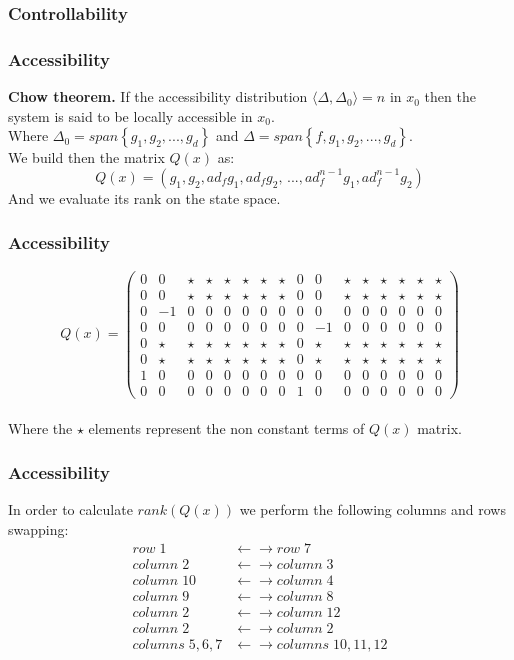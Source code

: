 \subsubsection{Controllability}
\begin{frame}
\frametitle{Accessibility}
\textbf{Chow theorem.} If the accessibility distribution $\langle\Delta, \Delta_0\rangle = n$ in $x_0$ then the system is said to be locally accessible in $x_0$.\\
\vspace{.8cm}
Where $\Delta_0 = span\left\{g_1, g_2,..., g_d\right\}$ and $\Delta = span\left\{f, g_1, g_2,..., g_d\right\}$.\\
\vspace{.8cm}
We build then the matrix $Q(x)$ as:
\begin{equation}
	Q(x) = (g_1, g_2, ad_fg_1, ad_fg_2,\,...,ad^{n-1}_fg_1,ad^{n-1}_fg_2)
\end{equation}
And we evaluate its rank on the state space.
\end{frame}
\begin{frame}
\frametitle{Accessibility}
\begin{equation*}
	Q(x) =%
	\begin{pmatrix}
		0 &0  &\star &\star &\star &\star &\star &\star &0 &0 &\star &\star &\star &\star &\star &\star \\
		0 &0  &\star &\star &\star &\star &\star &\star &0 &0 &\star &\star &\star &\star &\star &\star \\
		0 &-1 &0 &0 &0 &0 &0 &0 &0 &0 &0 &0 &0 &0 &0 &0 \\
		0 &0  &0 &0 &0 &0 &0 &0 &0 &-1 &0 &0 &0 &0 &0 &0 \\
		0 &\star &\star &\star &\star &\star &\star &\star &0 &\star &\star &\star &\star &\star &\star &\star \\
		0 &\star &\star &\star &\star &\star &\star &\star &0 &\star &\star &\star &\star &\star &\star &\star \\
		1 &0  &0 &0 &0 &0 &0 &0 &0 &0 &0 &0 &0 &0 &0 &0 \\
		0 &0  &0 &0 &0 &0 &0 &0 &1 &0 &0 &0 &0 &0 &0 &0
	\end{pmatrix}
\end{equation*}\\[10pt]
Where the $\star$ elements represent the non constant terms of $Q(x)$ matrix.
\end{frame}
%
\begin{frame}
\frametitle{Accessibility}
In order to calculate $rank(Q(x))$ we perform the following columns and rows swapping:
\begin{align*}
	row\;1 &\leftarrow\rightarrow row\;7 \\
	column\;2 &\leftarrow\rightarrow column\;3 \\
	column\;10 &\leftarrow\rightarrow column\;4 \\
	column\;9 &\leftarrow\rightarrow column\;8 \\
	column\;2 &\leftarrow\rightarrow column\;12 \\
	column\;2 &\leftarrow\rightarrow column\;2 \\
	columns\;5,6,7 &\leftarrow\rightarrow columns\;10,11,12
\end{align*}
\end{frame}
